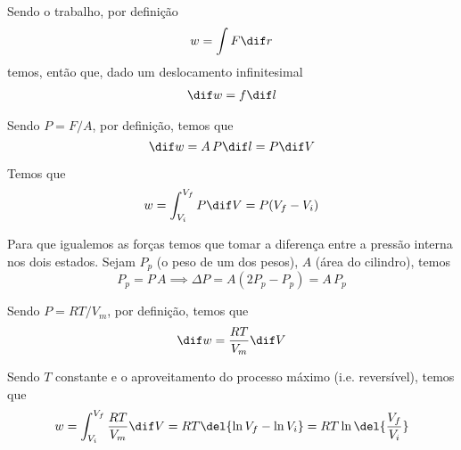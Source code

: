 \documentclass[border=5pt]{article}
\begin{document}
    Sendo o trabalho, por definição
    \[ w = \int F\dif r\]
    temos, então que, dado um deslocamento infinitesimal
    \begin{align*}
        \dif w = f \dif l
    \end{align*}

    Sendo $ P = F/A $, por definição, temos que
    \[ \dif w = A\,P \dif l = P\dif V \]

    Temos que
    \[ w = \int^{V_f}_{V_i} P\dif V=P(V_f-V_i) \]

    Para que igualemos as forças temos que tomar a diferença entre a pressão interna nos dois estados.
    Sejam 
    $P_p$ (o peso de um dos pesos),
    $A$ (área do cilindro), temos
    \[P_p = P\,A \implies \Delta P = A(2P_p-P_p)=A\,P_p\]

    Sendo $ P = RT/V_m $, por definição, temos que
    \[ \dif w = \dfrac{RT}{V_m}\dif V \]

    Sendo $T$ constante e o aproveitamento do processo máximo (i.e. reversível), temos que
    \[ w = \int^{V_f}_{V_i}\dfrac{RT}{V_m}\dif V = RT\del{\ln{V_f} - \ln{V_i}} = RT\ln{\del{\dfrac{V_f}{V_i}}}\]
\end{document}
